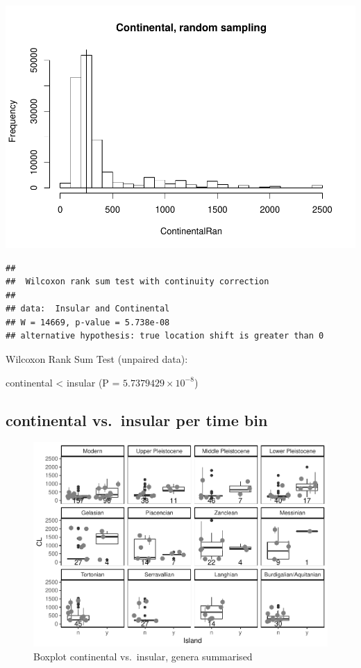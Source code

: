 \documentclass[]{article}
\begin{document}
\includegraphics{MA_JJ_files/figure-latex/RSCI-1.pdf}

\begin{verbatim}
## 
##  Wilcoxon rank sum test with continuity correction
## 
## data:  Insular and Continental
## W = 14669, p-value = 5.738e-08
## alternative hypothesis: true location shift is greater than 0
\end{verbatim}

Wilcoxon Rank Sum Test (unpaired data):

continental \textless{} insular (P = \(5.7379429\times 10^{-8}\))

\newpage

\subsection{continental vs.~insular per time
bin}\label{continental-vs.insular-per-time-bin-1}

\begin{figure}[htbp]
\centering
\includegraphics{MA_JJ_files/figure-latex/BPCIBins-1.pdf}
\caption{Boxplot continental vs.~insular, genera summarised}
\end{figure}
\end{document}
